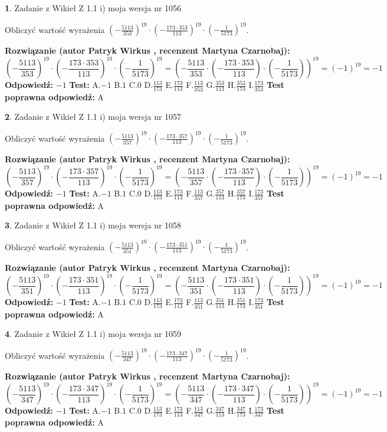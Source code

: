 \documentclass[12pt, a4paper]{article}
\theoremstyle{definition} %
\newtheorem{zad}{}
\newcommand{\zadStart}[1]{\begin{zad}#1\newline}
\newcommand{\zadStop}{\end{zad}}
\newcommand{\rozwStart}[2]{\noindent \textbf{Rozwiązanie (autor #1 , recenzent #2): }\newline}
\newcommand{\rozwStop}{\newline}
\newcommand{\odpStart}{\noindent \textbf{Odpowiedź:}\newline}
\newcommand{\odpStop}{\newline}
\newcommand{\testStart}{\noindent \textbf{Test:}\newline}
\newcommand{\testStop}{\newline}
\newcommand{\kluczStart}{\noindent \textbf{Test poprawna odpowiedź:}\newline}
\newcommand{\kluczStop}{\newline}
\begin{document}
\zadStart{Zadanie z Wikieł Z 1.1 i) moja wersja nr 1056}

Obliczyć wartość wyrażenia $(-\frac{5113}{353})^{19} \cdot (-\frac{173 \cdot 353}{113})^{19} \cdot (-\frac{1}{5173})^{19}$.
\zadStop
\rozwStart{Patryk Wirkus}{Martyna Czarnobaj}
$$(-\frac{5113}{353})^{19} \cdot (-\frac{173 \cdot 353}{113})^{19} \cdot (-\frac{1}{5173})^{19} = (-\frac{5113}{353} \cdot (-\frac{173 \cdot 353}{113}) \cdot (-\frac{1}{5173}))^{19} = (-1)^{19} = -1$$
\rozwStop
\odpStart
$-1$
\odpStop
\testStart
A.$-1$ B.$1$ C.$0$ D.$\frac{113}{173}$ E.$\frac{173}{113}$
F.$\frac{113}{353}$ G.$\frac{353}{113}$
H.$\frac{353}{173}$
I.$\frac{173}{353}$
\testStop
\kluczStart
A
\kluczStop



\zadStart{Zadanie z Wikieł Z 1.1 i) moja wersja nr 1057}

Obliczyć wartość wyrażenia $(-\frac{5113}{357})^{19} \cdot (-\frac{173 \cdot 357}{113})^{19} \cdot (-\frac{1}{5173})^{19}$.
\zadStop
\rozwStart{Patryk Wirkus}{Martyna Czarnobaj}
$$(-\frac{5113}{357})^{19} \cdot (-\frac{173 \cdot 357}{113})^{19} \cdot (-\frac{1}{5173})^{19} = (-\frac{5113}{357} \cdot (-\frac{173 \cdot 357}{113}) \cdot (-\frac{1}{5173}))^{19} = (-1)^{19} = -1$$
\rozwStop
\odpStart
$-1$
\odpStop
\testStart
A.$-1$ B.$1$ C.$0$ D.$\frac{113}{173}$ E.$\frac{173}{113}$
F.$\frac{113}{357}$ G.$\frac{357}{113}$
H.$\frac{357}{173}$
I.$\frac{173}{357}$
\testStop
\kluczStart
A
\kluczStop



\zadStart{Zadanie z Wikieł Z 1.1 i) moja wersja nr 1058}

Obliczyć wartość wyrażenia $(-\frac{5113}{351})^{19} \cdot (-\frac{173 \cdot 351}{113})^{19} \cdot (-\frac{1}{5173})^{19}$.
\zadStop
\rozwStart{Patryk Wirkus}{Martyna Czarnobaj}
$$(-\frac{5113}{351})^{19} \cdot (-\frac{173 \cdot 351}{113})^{19} \cdot (-\frac{1}{5173})^{19} = (-\frac{5113}{351} \cdot (-\frac{173 \cdot 351}{113}) \cdot (-\frac{1}{5173}))^{19} = (-1)^{19} = -1$$
\rozwStop
\odpStart
$-1$
\odpStop
\testStart
A.$-1$ B.$1$ C.$0$ D.$\frac{113}{173}$ E.$\frac{173}{113}$
F.$\frac{113}{351}$ G.$\frac{351}{113}$
H.$\frac{351}{173}$
I.$\frac{173}{351}$
\testStop
\kluczStart
A
\kluczStop



\zadStart{Zadanie z Wikieł Z 1.1 i) moja wersja nr 1059}

Obliczyć wartość wyrażenia $(-\frac{5113}{347})^{19} \cdot (-\frac{173 \cdot 347}{113})^{19} \cdot (-\frac{1}{5173})^{19}$.
\zadStop
\rozwStart{Patryk Wirkus}{Martyna Czarnobaj}
$$(-\frac{5113}{347})^{19} \cdot (-\frac{173 \cdot 347}{113})^{19} \cdot (-\frac{1}{5173})^{19} = (-\frac{5113}{347} \cdot (-\frac{173 \cdot 347}{113}) \cdot (-\frac{1}{5173}))^{19} = (-1)^{19} = -1$$
\rozwStop
\odpStart
$-1$
\odpStop
\testStart
A.$-1$ B.$1$ C.$0$ D.$\frac{113}{173}$ E.$\frac{173}{113}$
F.$\frac{113}{347}$ G.$\frac{347}{113}$
H.$\frac{347}{173}$
I.$\frac{173}{347}$
\testStop
\kluczStart
A
\kluczStop
\end{document}
